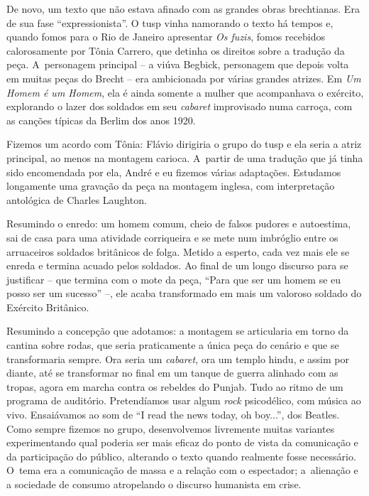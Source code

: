 {De novo, um texto que não estava afinado com as grandes obras
brechtianas. Era de sua fase “expressionista”. O {\sc tusp} vinha namorando o
texto há tempos e, quando fomos para o Rio de Janeiro apresentar {\it Os
fuzis}, fomos recebidos calorosamente por Tônia Carrero, que detinha os
direitos sobre a tradução da peça. A~personagem principal -- a viúva Begbick,
personagem que depois volta em muitas peças do Brecht -- era ambicionada por
várias grandes atrizes. Em {\it Um Homem é um Homem}, ela é
ainda somente a mulher que acompanhava o exército, explorando o lazer
dos soldados em seu {\it cabaret} improvisado numa carroça, com as
canções típicas da Berlim dos anos 1920.

Fizemos um acordo com Tônia: Flávio dirigiria o grupo do {\sc tusp} e ela
seria a atriz principal, ao menos na montagem carioca. A~partir de uma
tradução que já tinha sido encomendada por ela, André e eu fizemos
várias adaptações. Estudamos longamente uma gravação da peça na montagem
inglesa, com interpretação antológica de Charles Laughton.

Resumindo o enredo: um homem comum, cheio de falsos pudores e autoestima,
sai de casa para uma atividade corriqueira e se mete num imbróglio entre
os arruaceiros soldados britânicos de folga. Metido a esperto, cada vez
mais ele se enreda e termina acuado pelos soldados. Ao final de um longo
discurso para se justificar -- que termina com o mote da peça, “Para que ser
um homem se eu posso ser um sucesso” --, ele acaba transformado em mais um
valoroso soldado do Exército Britânico.

Resumindo a concepção que adotamos: a montagem se articularia em torno da
cantina sobre rodas, que seria praticamente a única peça do cenário e
que se transformaria sempre. Ora seria um {\it cabaret}, ora um templo
hindu, e assim por diante, até se transformar no final em um tanque de
guerra alinhado com as tropas, agora em marcha contra os rebeldes do
Punjab. Tudo ao ritmo de um programa de auditório. Pretendíamos usar
algum {\it rock} psicodélico, com música ao vivo.
Ensaiávamos ao som de “I read the news today, oh boy...”, dos Beatles.
Como sempre fizemos no grupo, desenvolvemos livremente muitas variantes
experimentando qual poderia ser mais eficaz do ponto de vista da
comunicação e da participação do público, alterando o texto quando
realmente fosse necessário. O~tema era a comunicação de massa e a
relação com o espectador; a~alienação e a sociedade de consumo
atropelando o discurso humanista em crise.

\subject{Repressão política e fim do {\cap tusp}}

}
